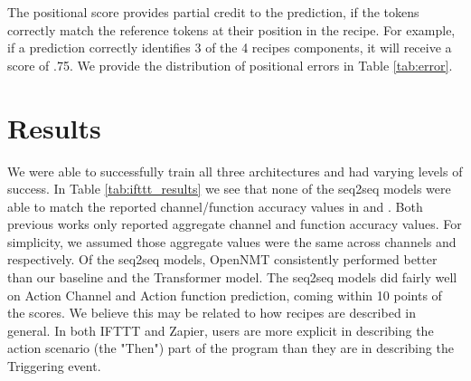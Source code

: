 \documentclass[letterpaper]{article} %
\begin{document}
The positional score provides partial credit to the prediction, if the tokens correctly match the reference tokens at their position in the recipe. For example, if a prediction correctly identifies 3 of the 4 recipes components, it will receive a score of .75. We provide the distribution of positional errors in Table \ref{tab:error}.


\section{Results}

We were able to successfully train all three architectures and had varying levels of success. In Table \ref{tab:ifttt_results} we see that none of the seq2seq models were able to match the reported channel/function accuracy values in \citeauthor{chen2016latent} \citeyear{chen2016latent} and \citeauthor{beltagy-quirk-2016-improved} \citeyear{beltagy-quirk-2016-improved}. Both previous works only reported aggregate channel and function accuracy values. For simplicity, we assumed those aggregate values were the same across channels and  respectively. Of the seq2seq models, OpenNMT consistently performed better than our baseline and the Transformer model. The seq2seq models did fairly well on Action Channel and Action function prediction, coming within 10 points of the \citeauthor{chen2016latent} \citeyear{chen2016latent} scores. We believe this may be related to how recipes are described in general. In both IFTTT and Zapier, users are more explicit in describing the action scenario (the "Then") part of the program than they are in describing the Triggering event.
\end{document}

